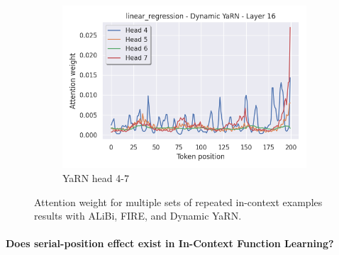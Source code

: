 \documentclass[letterpaper]{article} %
\begin{document}
\begin{figure}[tp]
\begin{subfigure}[t]{0.32\linewidth}
        \includegraphics[width=\linewidth]{AnonymousSubmission/LaTeX/imgs/analysis/dyarn_head4.png}
        \caption{YaRN head 4-7}
    \end{subfigure}
    \caption{Attention weight for multiple sets of repeated in-context examples results with ALiBi, FIRE, and Dynamic YaRN.}
    \label{fig:pes_attn}
\end{figure}

\paragraph{Does serial-position effect exist in In-Context Function Learning?}
\end{document}
